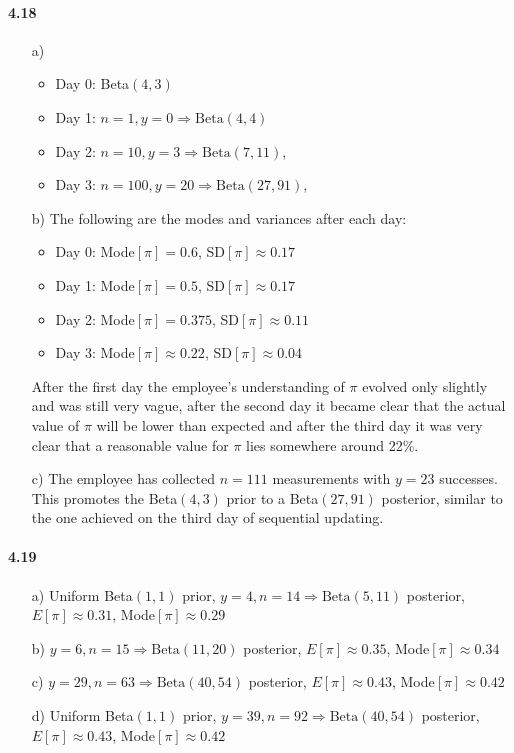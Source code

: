 \documentclass[fontsize=11pt,DIV=18,parskip=half]{scrartcl}
\begin{document}
\paragraph{4.18}
\begin{enumerate}
\item[a)] 
\begin{itemize}
\item Day 0: Beta$(4,3)$
\item Day 1: $n=1, y=0 \Rightarrow \text{Beta}(4,4)$
\item Day 2: $n=10, y=3 \Rightarrow \text{Beta}(7,11)$,
\item Day 3: $n=100, y=20 \Rightarrow \text{Beta}(27,91)$,
\end{itemize}
\item[b)] The following are the modes and variances after each day:

\begin{itemize}
\item Day 0: Mode$[\pi] = 0.6$, SD$[\pi] \approx 0.17$
\item Day 1: Mode$[\pi] = 0.5$, SD$[\pi] \approx 0.17$
\item Day 2: Mode$[\pi] = 0.375$, SD$[\pi] \approx 0.11$
\item Day 3: Mode$[\pi] \approx 0.22$, SD$[\pi] \approx 0.04$
\end{itemize}

After the first day the employee's understanding of $\pi$ evolved only slightly and was still very vague, after the second day it became clear that the actual value of $\pi$ will be lower than expected and after the third day it was very clear that a reasonable value for $\pi$ lies somewhere around 22\%.

\item[c)] The employee has collected $n=111$ measurements with $y=23$ successes. This promotes the Beta$(4,3)$ prior to a Beta$(27,91)$ posterior, similar to the one achieved on the third day of sequential updating.
\end{enumerate}

\paragraph{4.19}
\begin{enumerate}
\item[a)] Uniform Beta$(1,1)$ prior, $y=4, n=14 \Rightarrow \text{Beta}(5,11)$ posterior, $E[\pi] \approx 0.31$, Mode$[\pi] \approx 0.29$
\item[b)] $y=6, n=15 \Rightarrow \text{Beta}(11,20)$ posterior, $E[\pi] \approx 0.35$, Mode$[\pi] \approx 0.34$
\item[c)] $y=29, n=63 \Rightarrow \text{Beta}(40,54)$ posterior, $E[\pi] \approx 0.43$, Mode$[\pi] \approx 0.42$
\item[d)] Uniform Beta$(1,1)$ prior, $y=39, n=92 \Rightarrow \text{Beta}(40,54)$ posterior, $E[\pi] \approx 0.43$, Mode$[\pi] \approx 0.42$
\end{enumerate}
\end{document}
